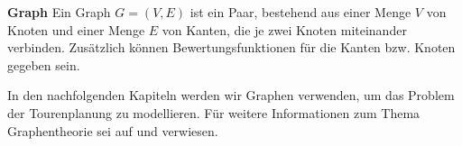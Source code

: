 \clearpage
\begin{definition}[]{\textbf{Graph}} \newline
Ein Graph $G = \left( V, E \right)$ ist ein Paar, bestehend aus einer Menge $V$ von Knoten und einer Menge $E$ von Kanten, die je zwei Knoten miteinander verbinden. Zusätzlich können Bewertungsfunktionen für die Kanten bzw. Knoten gegeben sein.
\label{def:graph}
\end{definition}

\noindent
In den nachfolgenden Kapiteln werden wir Graphen verwenden, um das Problem der Tourenplanung zu modellieren. Für weitere Informationen zum Thema Graphentheorie sei auf \cite{Beutelspacher} und \cite{Turau} verwiesen.


